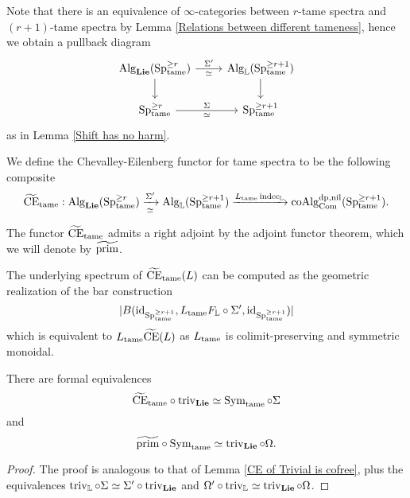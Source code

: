 Note that there is an equivalence of $\infty$-categories between $r$-tame spectra and $(r+1)$-tame spectra by Lemma \ref{Relations between different tameness}, hence we obtain a pullback diagram 
\[
    \begin{tikzcd}
	\Alg_{\spLie}(\Sp^{\geq r}_{\tame})    & \Alg_{\BL}(\Sp^{\geq r+1}_{\tame})\\
	 \Sp^{\geq r}_{\tame} & \Sp^{\geq r+1}_{\tame}
	\arrow[from=1-1, to = 1-2, "\Sigma'", "\simeq" below]
	\arrow[from=1-1 , to =2-1,  left]
	\arrow[from=1-2 , to =2-2,  right]
	\arrow[from=2-1, to=2-2, "\Sigma", "\simeq" below]
\end{tikzcd}
\]
as in Lemma \ref{Shift has no harm}.

\begin{definition}
\label{Chevalley-Eilenberg functor for tame spectra}
We define the Chevalley-Eilenberg functor for tame spectra
to be the following composite
$$
\widetilde{\operatorname{CE}}_{\operatorname{\operatorname{tame}}}: \operatorname{Alg}_{\mathbf{Lie}}(\operatorname{Sp}^{\geq r}_{\operatorname{\operatorname{tame}}})
\xrightarrow[\simeq]{\Sigma'}
\operatorname{Alg}_{{\mathbb{L}}}(\operatorname{Sp}^{\geq r+1}_{\operatorname{\operatorname{tame}}})
\xrightarrow{L_{\operatorname{\operatorname{tame}}} \operatorname{indec}_{{\mathbb{L}}}}
\operatorname{coAlg}^{\operatorname{dp}, \operatorname{nil}}_{\operatorname{Com}}(\operatorname{Sp}^{\geq r+1}_{\operatorname{\operatorname{tame}}}).
$$
\end{definition}

\begin{remark}
The functor $\widetilde{\operatorname{CE}}_{\operatorname{\operatorname{tame}}}$ admits a right adjoint by the adjoint functor theorem, which we will denote by $\widetilde{\operatorname{prim}}$.
\end{remark}



\begin{remark}
\label{Formula for computing CE_tame(L)}
The underlying spectrum of $\widetilde{\operatorname{CE}}_{\operatorname{\operatorname{tame}}}(L)$ can be computed as the geometric realization of the bar construction 
$$
|B(\operatorname{id}_{\operatorname{Sp}^{\geq r+1}_{\operatorname{\operatorname{tame}}}}, L_{\operatorname{\operatorname{tame}}}F_{{\mathbb{L}}}\circ \Sigma', \operatorname{id}_{\operatorname{Sp}^{\geq r+1}_{\operatorname{\operatorname{tame}}}})|
$$
which is equivalent to $L_{\operatorname{\operatorname{tame}}}\widetilde{\operatorname{CE}}(L)$ as $L_{\operatorname{\operatorname{tame}}}$ is colimit-preserving and symmetric monoidal.
\end{remark}

\begin{lemma}
\label{Lemma 3.6.20}
There are formal equivalences
$$
\widetilde{\operatorname{CE}}_{\operatorname{\operatorname{tame}}}\circ \operatorname{triv}_{\mathbf{Lie}}\simeq \operatorname{Sym}_{\operatorname{\operatorname{tame}}}\circ \Sigma
$$
and
$$
\widetilde{\operatorname{prim}}\circ \operatorname{Sym}_{\operatorname{\operatorname{tame}}} \simeq \operatorname{triv}_{\mathbf{Lie}}\circ \Omega.
$$
\end{lemma}
\begin{proof}
    The proof is analogous to that of Lemma \ref{CE of Trivial is cofree}, plus the equivalences 
    $
    \operatorname{triv}_{{\mathbb{L}}}\circ \Sigma \simeq \Sigma'\circ \operatorname{triv}_{\mathbf{Lie}} 
    $
    and $\Omega' \circ \operatorname{triv}_{{\mathbb{L}}} \simeq \operatorname{triv}_{\mathbf{Lie}}\circ \Omega $.
    
\end{proof}



